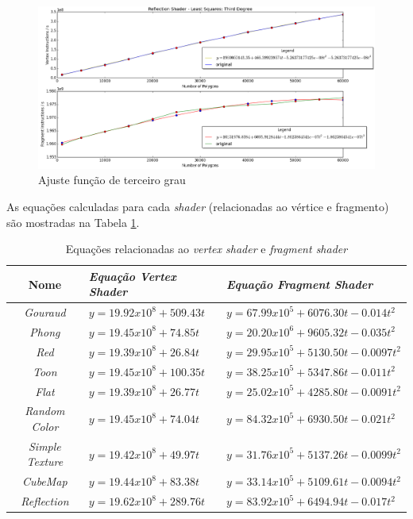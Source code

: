 	\begin{figure}[h]
	\centering
		\includegraphics[keepaspectratio=true,scale=0.4]{figuras/reflectionthird.png}
	\caption{Ajuste função de terceiro grau}
	\label{third}
	\end{figure}	

	As equações calculadas para cada \textit{shader} (relacionadas ao vértice e fragmento) são mostradas na Tabela \ref{equacoes}.

	\begin{table}[h]
	\centering	
	\begin{tabularx}{0.9\textwidth}{cXX}
		\toprule
		\textbf{Nome} & \textbf{\textit{Equação Vertex Shader}} & \textbf{\textit{Equação Fragment Shader}}  \\
		\midrule
		\textit{Gouraud} & $y = 19.92 x 10^8 + 509.43t$ & $y = 67.99 x 10 ^5 + 6076.30t - 0.014t^2$ \\
		\textit{Phong} &  $y = 19.45 x 10^8 + 74.85t$ & $y = 20.20 x 10^6 + 9605.32t - 0.035t^2$\\
		\textit{Red} & $y = 19.39 x 10^8 + 26.84t$ & $y = 29.95 x 10 ^5 + 5130.50t - 0.0097t^2$ \\
		\textit{Toon} & $y = 19.45 x 10^8 + 100.35t$ & $y = 38.25 x 10 ^5 + 5347.86t - 0.011t^2$ \\
		\textit{Flat} & $y = 19.39 x 10^8 + 26.77t$ & $y = 25.02 x 10 ^5 + 4285.80t - 0.0091t^2$ \\
		\textit{Random Color} & $y = 19.45 x 10^8 + 74.04t$ & $y = 84.32 x 10 ^5 + 6930.50t - 0.021t^2$ \\
		\textit{Simple Texture} & $y = 19.42 x 10^8 + 49.97t$ & $y = 31.76 x 10 ^5 + 5137.26t - 0.0099t^2$ \\
		\textit{CubeMap} & $y = 19.44 x 10^8 + 83.38t$ & $y = 33.14 x 10 ^5 + 5109.61t - 0.0094t^2$ \\
		\textit{Reflection} & $y = 19.62 x 10^8 + 289.76t$ & $y = 83.92 x 10 ^5 + 6494.94t - 0.017t^2$ \\
	
		\bottomrule
	\end{tabularx}
	\caption{Equações relacionadas ao \textit{vertex shader} e \textit{fragment shader}}
	\label{equacoes}
	\end{table}
